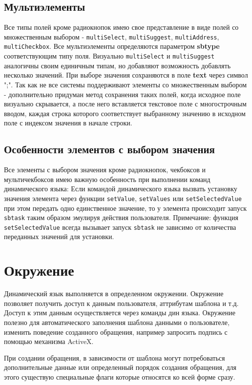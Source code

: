 \documentclass[../index.tex]{subfiles}
\begin{document}
\subsection{Мультиэлементы}
    Все типы полей кроме радиокнопок имею свое представление в виде полей со множественным выбором -  \verb|multiSelect|, \verb|multiSuggest|, \verb|multiAddress|, \verb|multiCheckbox|.
    Все мультиэлементы определяются параметром \textbf{sbtype} соответствующим типу поля. Визуально \verb|multiSelect| и \verb|multiSuggest| аналогичны своим единичным типам, но добавляют возможность добавлять несколько значений.
    При выборе значения сохраняются в поле \textbf{text} через символ ";". Так как не все системы поддерживают элементы со множественным выбором - дополнительно придуман метод сохранения таких полей, когда исходное поле визуально скрывается, а после него вставляется текстовое поле с многострочным вводом, каждая строка которого соответствует выбранному значению в исходном поле с индексом значения в начале строки.
\subsection{Особенности элементов с выбором значения}\label{sec:dynfom:selectspecial} 
    Все элементы с выбором значения кроме радиокнопок, чекбоксов и мультичекбоксов имею важную особенность при выполнении команд динамического языка: Если командой динамического языка вызвать установку значения элемента через функции \verb|setValue|, \verb|setValues| или \verb|setSelectedValue| при этом передать одно единственное значение, то у элемента происходит запуск \verb|sbtask| таким образом эмулируя действия пользователя.
    Примечание: функция \verb|setSelectedValue| всегда вызывает запуск \verb|sbtask| не зависимо от количества переданных значений для установки.

\section{Окружение}  %

Динамический язык выполняется в определенном окружении. Окружение позволяет получить доступ к данным пользователя,
аттрибутам шаблона и т.д. Доступ к этим данным осуществляется через команды дин языка. 
Окружение полезно для автоматического заполнения шаблона данными о пользователе, изменить поведение созданного обращения,
например запросить подпись с помощью механизма ActiveX.

При создании обращения, в зависимости от шаблона могут потребоваться дополнительные данные или определенный порядок 
создания обращения, для этого существую специальные флаги которые относятся ко всей форме сразу.
\end{document}
